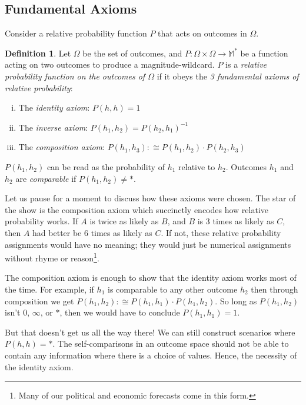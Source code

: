 \documentclass[twoside]{article}
\theoremstyle{plain}%
\theoremstyle{definition}
\newtheorem{definition}{Definition}[section]
\theoremstyle{remark}
\begin{document}
\subsection{Fundamental Axioms}

Consider a relative probability function \(P\) that acts on outcomes in \(\Omega\).

\begin{definition}
\label{def:fundamental_laws}
Let \(\Omega\) be the set of outcomes, and \(P: \Omega \times \Omega \rightarrow \mathbb{M}^*\) be a function acting on two outcomes to produce a magnitude-wildcard. \(P\) is a \textit{relative probability function on the outcomes of \(\Omega\)} if it obeys the \textit{3 fundamental axioms of relative probability}:

\begin{enumerate}[(i)]
\item The \textit{identity axiom}: \(P(h, h) = 1\)
\item The \textit{inverse axiom}: \(P(h_1, h_2) = P(h_2, h_1)^{-1}\)
\item The \textit{composition axiom}: \(P(h_1, h_3) :\cong P(h_1, h_2) \cdot P(h_2, h_3)\)
\end{enumerate}

\end{definition}

\(P(h_1, h_2)\) can be read as the probability of \(h_1\) relative to \(h_2\). Outcomes \(h_1\) and \(h_2\) are \textit{comparable} if \(P(h_1, h_2) \neq \ast\).

Let us pause for a moment to discuss how these axioms were chosen. The star of the show is the composition axiom which succinctly encodes how relative probability works. If \(A\) is twice as likely as \(B\), and \(B\) is 3 times as likely as \(C\), then \(A\) had better be 6 times as likely as \(C\). If not, these relative probability assignments would have no meaning; they would just be numerical assignments without rhyme or reason\footnote{Many of our political and economic forecasts come in this form.}.

The composition axiom is enough to show that the identity axiom works most of the time. For example, if \(h_1\) is comparable to any other outcome \(h_2\) then through composition we get \(P(h_1, h_2) :\cong P(h_1, h_1) \cdot P(h_1, h_2)\). So long as \(P(h_1, h_2)\) isn't \(0\), \(\infty\), or \(\ast\), then we would have to conclude \(P(h_1, h_1) = 1\).

But that doesn't get us all the way there! We can still construct scenarios where \(P(h, h) = \ast\). The self-comparisons in an outcome space should not be able to contain any information where there is a choice of values. Hence, the necessity of the identity axiom.
\end{document}
